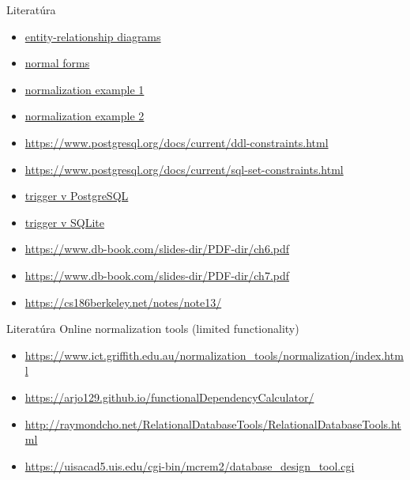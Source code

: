 \documentclass[12pt]{beamer}
\begin{document}
\begin{frame}{Literatúra}
\begin{itemize}
\item {\scriptsize\href{https://www.lucidchart.com/pages/er-diagrams}{entity-relationship diagrams}}
\item {\scriptsize\href{https://en.wikipedia.org/wiki/Database_normalization}{normal forms}}
\item {\scriptsize\href{https://mariadb.com/kb/en/database-normalization-overview/}{normalization example 1}}
\item {\scriptsize\href{https://www.databasestar.com/database-normalization/}{normalization example 2}}
\item {\scriptsize\url{https://www.postgresql.org/docs/current/ddl-constraints.html}}
\item {\scriptsize\url{https://www.postgresql.org/docs/current/sql-set-constraints.html}}
\item {\scriptsize\href{https://www.postgresqltutorial.com/postgresql-triggers/creating-first-trigger-postgresql/}{trigger v PostgreSQL}}
\item {\scriptsize\href{https://www.sqlitetutorial.net/sqlite-trigger/}{trigger v SQLite}}
\item {\scriptsize\url{https://www.db-book.com/slides-dir/PDF-dir/ch6.pdf}}
\item {\scriptsize\url{https://www.db-book.com/slides-dir/PDF-dir/ch7.pdf}}
\item {\scriptsize\url{https://cs186berkeley.net/notes/note13/}}
\end{itemize}
\end{frame}


\begin{frame}{Literatúra}
Online normalization tools (limited functionality)
\begin{itemize}
\item {\scriptsize\url{https://www.ict.griffith.edu.au/normalization_tools/normalization/index.html}}
\item {\scriptsize\url{https://arjo129.github.io/functionalDependencyCalculator/}}
\item {\scriptsize\url{http://raymondcho.net/RelationalDatabaseTools/RelationalDatabaseTools.html}}
\item {\scriptsize\url{https://uisacad5.uis.edu/cgi-bin/mcrem2/database_design_tool.cgi}}
\end{itemize}
\end{frame}
\end{document}
